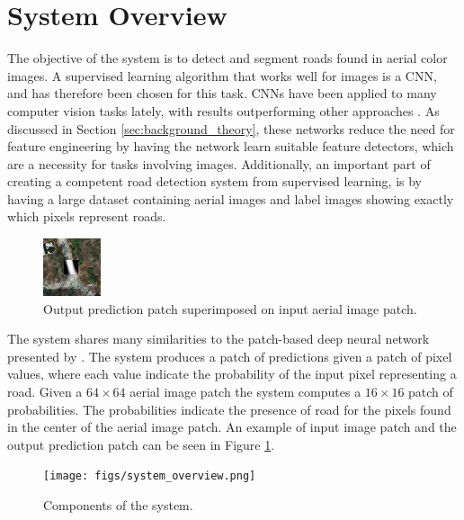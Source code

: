 \section{System Overview}
\label{sec:systemOverview}



The objective of the system is to detect and segment roads found in aerial color images. A supervised learning algorithm that works well for images is a \ac{CNN}, and has therefore been chosen for this task. \ac{CNN}s have been applied to many computer vision tasks lately, with results outperforming other approaches \citep{Krizhevsky_imagenet}. As discussed in Section \ref{sec:background_theory}, these networks reduce the need for feature engineering by having the network learn suitable feature detectors, which are a necessity for tasks involving images. Additionally, an important part of creating a competent road detection system from supervised learning, is by having a large dataset containing aerial images and label images showing exactly which pixels represent roads.\\

\begin{figure}[t]
\begin{center}
\includegraphics[width=0.15\columnwidth]{figs/labeloverlay.png}
\caption[Patches]{Output prediction patch superimposed on input aerial image patch.}
\label{fig:system_data_patch}
\end{center}
\end{figure}

The system shares many similarities to the patch-based deep neural network presented by \cite{Mnih_aerial_images_noisy}. The system produces a patch of predictions given a patch of pixel values, where each value indicate the probability of the input pixel representing a road. Given a $64 \times 64$ aerial image patch the system computes a $16 \times 16$ patch of probabilities. The probabilities indicate the presence of road for the pixels found in the center of the aerial image patch. An example of input image patch and the output prediction patch can be seen in Figure \ref{fig:system_data_patch}.  \\

\begin{figure}[t]
\begin{center}
\texttt{[image: figs/system\_overview.png]}
\caption[Components of the system]{Components of the system.}
\label{fig:system_components}
\end{center}
\end{figure}

